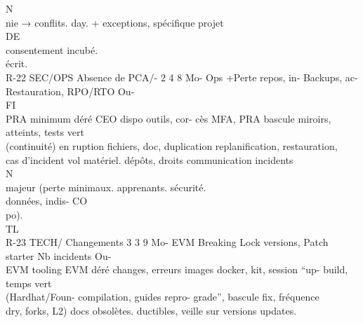 \documentclass[12pt,landscape,a4paper]{article}
\begin{document}
N\\
nie → conflits.                         day.              +       exceptions, spécifique projet\\
\vspace{0.5em}
\vspace{0.5em}
\vspace{0.5em}
\vspace{0.5em}
DE\\
consentement       incubé.\\
écrit.\\
R-22   SEC/OPS Absence de PCA/- 2 4 8        Mo- Ops      +Perte repos, in- Backups,       ac- Restauration,   RPO/RTO       Ou-\\
\vspace{0.5em}
\vspace{0.5em}
\vspace{0.5em}
\vspace{0.5em}
FI\\
PRA     minimum               déré CEO      dispo outils, cor- cès MFA, PRA bascule miroirs, atteints, tests vert\\
(continuité)    en                          ruption fichiers, doc, duplication replanification, restauration,\\
cas     d’incident                          vol matériel.      dépôts,   droits communication incidents\\
\vspace{0.5em}
\vspace{0.5em}
\vspace{0.5em}
\vspace{0.5em}
N\\
majeur      (perte                                             minimaux.        apprenants.     sécurité.\\
données,     indis-                                                                            CO\\
po).\\
TL\\
R-23   TECH/     Changements     3 3 9       Mo- EVM        Breaking         Lock   versions, Patch       starter Nb incidents Ou-\\
EVM       tooling    EVM              déré           changes, erreurs images docker, kit, session “up- build, temps vert\\
(Hardhat/Foun-                             compilation,     guides     repro- grade”, bascule fix, fréquence\\
dry, forks, L2)                            docs obsolètes. ductibles, veille sur       versions updates.\\
\end{document}
